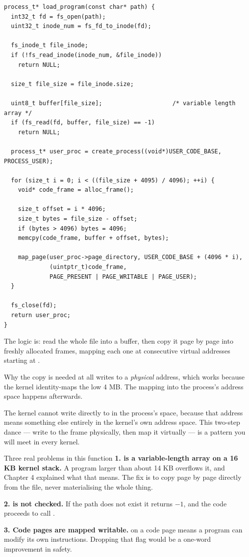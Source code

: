 \begin{lstlisting}[style=c]
process_t* load_program(const char* path) {
  int32_t fd = fs_open(path);
  uint32_t inode_num = fs_fd_to_inode(fd);

  fs_inode_t file_inode;
  if (!fs_read_inode(inode_num, &file_inode))
    return NULL;

  size_t file_size = file_inode.size;

  uint8_t buffer[file_size];                    /* variable length array */
  if (fs_read(fd, buffer, file_size) == -1)
    return NULL;

  process_t* user_proc = create_process((void*)USER_CODE_BASE, PROCESS_USER);

  for (size_t i = 0; i < ((file_size + 4095) / 4096); ++i) {
    void* code_frame = alloc_frame();

    size_t offset = i * 4096;
    size_t bytes = file_size - offset;
    if (bytes > 4096) bytes = 4096;
    memcpy(code_frame, buffer + offset, bytes);

    map_page(user_proc->page_directory, USER_CODE_BASE + (4096 * i),
             (uintptr_t)code_frame,
             PAGE_PRESENT | PAGE_WRITABLE | PAGE_USER);
  }

  fs_close(fd);
  return user_proc;
}
\end{lstlisting}

The logic is: read the whole file into a buffer, then copy it page by page into freshly allocated
frames, mapping each one at consecutive virtual addresses starting at .

\begin{concept}{Why the copy is needed at all}
 writes to a \emph{physical} address, which works because the kernel
identity-maps the low 4 MB. The mapping into the process's address space happens afterwards.

The kernel cannot write directly to  in the process's space, because that address means
something else entirely in the kernel's own address space. This two-step dance --- write to the
frame physically, then map it virtually --- is a pattern you will meet in every kernel.
\end{concept}

\begin{danger}{Three real problems in this function}
\textbf{1.  is a variable-length array on a 16 KB kernel stack.} A
program larger than about 14 KB overflows it, and Chapter 4 explained what that means. The fix is to
copy page by page directly from the file, never materialising the whole thing.

\textbf{2.  is not checked.} If the path does not exist it returns $-1$, and the code
proceeds to call .

\textbf{3. Code pages are mapped writable.}  on a code page means a program can
modify its own instructions. Dropping that flag would be a one-word improvement in safety.
\end{danger}

